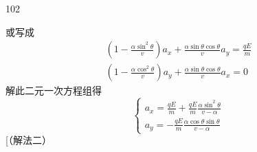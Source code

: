 \begin{solution}{102}
\begin{subsolution}
\begin{equation}
            \label{eq:19.p102}
        \end{equation}
        或写成
        \begin{align*}
            \left(1 - \frac {\alpha \sin^ {2} \theta}{v}\right) a _ {x} + \frac {\alpha \sin \theta \cos \theta}{v} a _ {y} = \frac {q E}{m} \\
            \left(1 - \frac {\alpha \cos^ {2} \theta}{v}\right) a _ {y} + \frac {\alpha \sin \theta \cos \theta}{v} a _ {x} = 0
        \end{align*}
        解此二元一次方程组得
        \begin{equation}
            \left\{ \begin{array}{l} a _ {x} = \frac {q E}{m} + \frac {q E}{m} \frac {\alpha \sin^ {2} \theta}{v - \alpha} \\ a _ {y} = - \frac {q E}{m} \frac {\alpha \cos \theta \sin \theta}{v - \alpha} \end{array} \right.
            \label{eq:20.p102}
        \end{equation}
        [（解法二）


\end{subsolution}
\end{solution}
